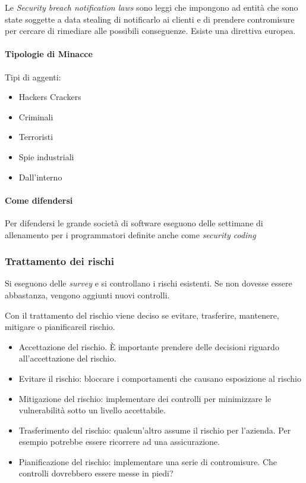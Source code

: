 

Le \textit{Security breach notification laws} sono leggi che impongono ad entità
che sono state soggette a data stealing di notificarlo ai clienti e di prendere
contromisure per cercare di rimediare alle possibili conseguenze. Esiste una
direttiva europea.


\paragraph*{Tipologie di Minacce}

Tipi di aggenti:
\begin{itemize}
\item Hackers Crackers
\item Criminali
\item Terroristi
\item Spie industriali
\item Dall'interno
\end{itemize}


\paragraph*{Come difendersi}

Per difendersi le grande società di software eseguono delle settimane di
allenamento per i programmatori definite anche come \textit{security coding}



\subsubsection{Trattamento dei rischi}

Si eseguono delle \textit{survey} e si controllano i rischi esistenti. Se non
dovesse essere abbastanza, vengono aggiunti nuovi controlli.

Con il trattamento del rischio viene deciso se evitare, trasferire, mantenere,
mitigare o pianificareil rischio.

\begin{itemize}
\item Accettazione del rischio. È importante prendere delle decisioni riguardo
all'accettazione del rischio.
\item Evitare il rischio: bloccare i comportamenti che causano esposizione al
rischio
\item Mitigazione del rischio: implementare dei controlli per minimizzare le
vulnerabilità sotto un livello accettabile.
\item Trasferimento del rischio: qualcun'altro assume il rischio per l'azienda.
Per esempio potrebbe essere ricorrere ad una assicurazione.
\item Pianificazione del rischio: implementare una serie di contromisure. Che
controlli dovrebbero essere messe in piedi?
\end{itemize}

